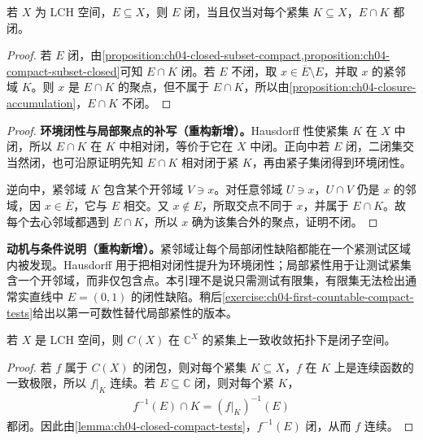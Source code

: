 \documentclass[../../main.tex]{subfiles}%
\begin{document}
\begin{lemma}\label{lemma:ch04-closed-compact-tests}
若 $X$ 为 LCH 空间，$E\subseteq X$，则 $E$ 闭，当且仅当对每个紧集 $K\subseteq X$，$E\cap K$ 都闭。
\end{lemma}
\begin{proof}
若 $E$ 闭，由\cref{proposition:ch04-closed-subset-compact,proposition:ch04-compact-subset-closed}可知 $E\cap K$ 闭。若 $E$ 不闭，取 $x\in\overline E\setminus E$，并取 $x$ 的紧邻域 $K$。则 $x$ 是 $E\cap K$ 的聚点，但不属于 $E\cap K$，所以由\cref{proposition:ch04-closure-accumulation}，$E\cap K$ 不闭。
\end{proof}
\begin{proof}
\textbf{环境闭性与局部聚点的补写（重构新增）。}Hausdorff 性使紧集 $K$ 在 $X$ 中闭，所以 $E\cap K$ 在 $K$ 中相对闭，等价于它在 $X$ 中闭。正向中若 $E$ 闭，二闭集交当然闭，也可沿原证明先知 $E\cap K$ 相对闭于紧 $K$，再由紧子集闭得到环境闭性。

逆向中，紧邻域 $K$ 包含某个开邻域 $V\ni x$。对任意邻域 $U\ni x$，$U\cap V$ 仍是 $x$ 的邻域，因 $x\in\overline E$，它与 $E$ 相交。又 $x\notin E$，所取交点不同于 $x$，并属于 $E\cap K$。故每个去心邻域都遇到 $E\cap K$，所以 $x$ 确为该集合外的聚点，证明不闭。
\end{proof}
\begin{remark}
\textbf{动机与条件说明（重构新增）。}紧邻域让每个局部闭性缺陷都能在一个紧测试区域内被发现。Hausdorff 用于把相对闭性提升为环境闭性；局部紧性用于让测试紧集含一个开邻域，而非仅包含点。本引理不是说只需测试有限集，有限集无法检出通常实直线中 $E=(0,1)$ 的闭性缺陷。稍后\cref{exercise:ch04-first-countable-compact-tests}给出以第一可数性替代局部紧性的版本。
\end{remark}
\begin{proposition}\label{proposition:ch04-continuous-compact-uniform-closed}
若 $X$ 是 LCH 空间，则 $C(X)$ 在 $\mathbb C^X$ 的紧集上一致收敛拓扑下是闭子空间。
\end{proposition}
\begin{proof}
若 $f$ 属于 $C(X)$ 的闭包，则对每个紧集 $K\subseteq X$，$f$ 在 $K$ 上是连续函数的一致极限，所以 $f|_K$ 连续。若 $E\subseteq\mathbb C$ 闭，则对每个紧 $K$，
\begin{align*}
f^{-1}(E)\cap K=(f|_K)^{-1}(E)
\end{align*}
都闭。因此由\cref{lemma:ch04-closed-compact-tests}，$f^{-1}(E)$ 闭，从而 $f$ 连续。
\end{proof}
\end{document}
